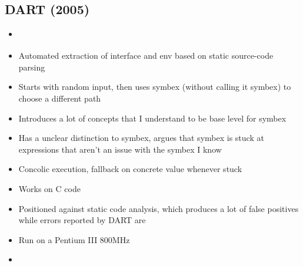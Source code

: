 \documentclass{article}
\begin{document}
\subsection{DART (2005)}
\begin{itemize}
    \item \cite{DART}
    \item Automated extraction of interface and env based on static source-code parsing
    \item Starts with random input, then uses symbex (without calling it symbex) to choose a different path
    \item Introduces a lot of concepts that I understand to be base level for symbex
    \item Has a unclear distinction to symbex, argues that symbex is stuck at expressions that aren't an issue with the symbex I know
    \item Concolic execution, fallback on concrete value whenever stuck
    \item Works on C code
    \item Positioned against static code analysis, which produces a lot of false positives while errors reported by DART are \cite{DART}
    \item Run on a Pentium III 800MHz
    \item {}\cite{DART}
\end{itemize}
\end{document}
